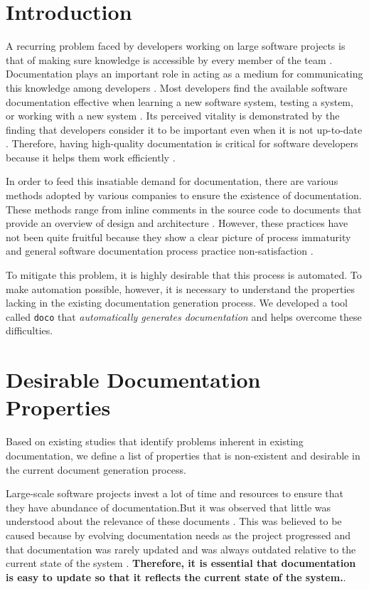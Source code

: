 \section{Introduction}

A recurring problem faced by developers working on large software projects is that of making sure knowledge is accessible by every member of the team \cite{Ko:2007}. Documentation plays an important role in acting as a medium for communicating this knowledge among developers \cite{Forward:2002}. Most developers find the  available  software  documentation
effective  when  learning  a  new  software  system, testing a system, or working with a new
system \cite{Lethbridge:2003}. Its perceived vitality is demonstrated by the finding that developers consider it to be important even when it is not up-to-date \cite{Forward:2002}. Therefore, having high-quality documentation is critical for software developers because it helps them work efficiently \cite{Robillard:2011} .

In order to feed this insatiable demand for documentation, there are various methods adopted by various companies to ensure the existence of documentation. These methods range from inline comments in the source code to documents that provide an overview of design and architecture \cite{Halvorsen:2018}. However, these practices have not been quite fruitful because they show a clear picture of process immaturity and general software documentation process practice non-satisfaction \cite{SEDocOverview}.

To mitigate this problem, it is highly desirable that this process is automated. To make automation possible, however, it is necessary to understand the properties lacking in the existing documentation generation process. We developed a tool called \texttt{doco} that \textit{automatically generates documentation} and helps overcome these difficulties.

\section{Desirable Documentation Properties}

Based on existing studies that identify problems inherent in existing documentation, we define a list of properties that is non-existent and desirable in the current document  generation process.

Large-scale software projects invest a lot of time and resources to ensure that they have abundance of documentation.But it was observed that little was understood about the relevance of these documents \cite{Forward:2002}. This was believed to be caused because by evolving documentation needs as the project progressed and that documentation was rarely updated and was always outdated relative to the current state of the system \cite{Forward:2002}. \textbf{Therefore, it is essential that documentation is easy to update so that it reflects the current state of the system.}.

